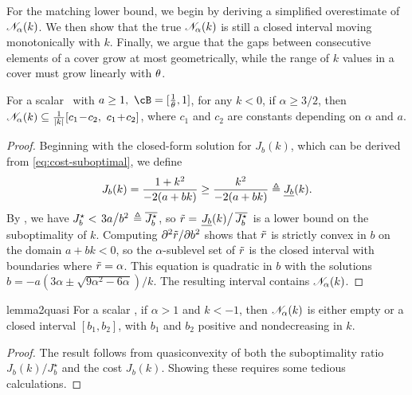 For the matching lower bound,
we begin by
deriving a simplified overestimate of $\mathscr{N}_{\alpha}(k)$.
We then show that the true $\mathscr{N}_{\alpha}(k)$
is still a closed interval moving monotonically with $k$.
Finally, we argue that
the gaps between consecutive elements of a cover grow at most geometrically,
while the range of $k$ values in a cover must grow linearly with $\theta$.

\begin{lemma}
\label{lem:scalar-neighborhood-optimistic}
	For a scalar \DDFproblem\ with $a \geq 1,\ \cB = [\recip \breadth, 1]$,
	for any $k < 0$,
	if $\alpha \geq 3/2$, then
	$\mathscr{N}_{\alpha}(k) \subseteq \frac{1}{|k|} [c_1 \!- \!c_2,\ c_1\! + \!c_2]$,
	where $c_1$ and $c_2$ are constants depending on $\alpha$ and $a$.
\end{lemma}
\begin{proof}
	Beginning with the closed-form solution for $J_b(k)$,
	which can be derived from \eqref{eq:cost-suboptimal},
	we define
	\begin{equation}
	\label{eq:Jbk}
		J_b(k) = \frac{1 + k^2}{-2(a + bk)}
		\geq \frac{k^2}{-2(a + bk)}
		\triangleq \underline{J_b}(k)
		.
	\end{equation}
	By , we have
	\(
		J^\star_b < \left. 3a \middle/ b^2 \right. \triangleq \overline{J^\star_b}
	\),
	so $\tilde r = \left. \underline{J_b}(k) \middle/ \,\overline{J^\star_b} \right.$
	is a lower bound on the suboptimality of $k$.
	Computing $\partial^2 \tilde r / \partial b^2$
	shows that $\tilde r$ is strictly convex in $b$ on the domain $a + bk < 0$,
	so the $\alpha$-sublevel set of $\tilde r$ is the closed interval
	with boundaries where $\tilde r = \alpha$.
	This equation is quadratic in $b$ with the solutions
	\(
		b = -a(3 \alpha \pm \sqrt{9 \alpha^2 - 6 \alpha})/k
	\).
	The resulting interval contains $\mathscr{N}_{\alpha}(k)$.
\end{proof}


\begin{restatable}{lemma2}{quasi}
\label{lem:subopt-convex}
	For a scalar \DDFproblem, if $\alpha > 1$
	and $k < -1$,
	then $\mathscr{N}_{\alpha}(k)$ is either empty or a closed interval
	$[b_1, b_2]$,
	with $b_1$ and $b_2$ positive and nondecreasing in $k$.
\end{restatable}
\begin{proof}
The result follows from quasiconvexity of
both the suboptimality ratio $J_b(k) / J^\star_b$
and the cost $J_b(k)$.
Showing these requires some tedious calculations.
\end{proof}

